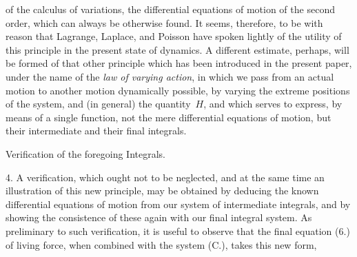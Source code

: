 of the calculus of variations, the differential equations of
motion of the second order, which can always be otherwise found.
It seems, therefore, to be with reason that {\sc Lagrange},
{\sc Laplace}, and {\sc Poisson} have spoken lightly of the utility
of this principle in the present state of dynamics.  A different
estimate, perhaps, will be formed of that other principle which
has been introduced in the present paper, under the name of the
{\it law of varying action}, in which we pass from an actual
motion to another motion dynamically possible, by varying the
extreme positions of the system, and (in general) the
quantity~$H$, and which serves to express, by means of a single
function, not the mere differential equations of motion, but
their intermediate and their final integrals.

\bigbreak

{\sectiontitle
Verification of the foregoing Integrals.\par}

\nobreak\bigskip

4.
A verification, which ought not to be neglected, and at the same
time an illustration of this new principle, may be obtained by
deducing the known differential equations of motion from our
system of intermediate integrals, and by showing the consistence
of these again with our final integral system.  As preliminary to
such verification, it is useful to observe that the final
equation (6.) of living force, when combined with the system
(C.), takes this new form,

\vfill\eject  %

